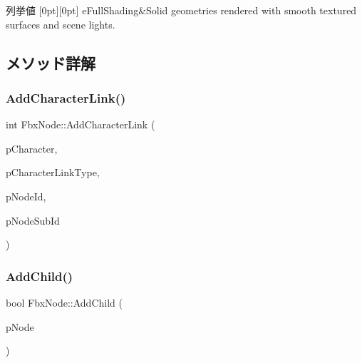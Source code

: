 \begin{DoxyEnumFields}{列挙値}
[0pt][0pt]{}\mbox{\label{class_fbx_node_ab65aa5e41d10dfb4c887667c9a56019daefdf7b2d72751923449653d4a31780b6}} 
e\+Full\+Shading&Solid geometries rendered with smooth textured surfaces and scene lights. \\
\hline

\end{DoxyEnumFields}


\subsection{メソッド詳解}
\mbox{\label{class_fbx_node_ad534d65600668327fe8abdd8f7628c1e}} 
\subsubsection{\texorpdfstring{Add\+Character\+Link()}{AddCharacterLink()}}
{\footnotesize\ttfamily int Fbx\+Node\+::\+Add\+Character\+Link (\begin{DoxyParamCaption}\item[{\hyperlink{class_fbx_character}{Fbx\+Character} $\ast$}]{p\+Character,  }\item[{int}]{p\+Character\+Link\+Type,  }\item[{int}]{p\+Node\+Id,  }\item[{int}]{p\+Node\+Sub\+Id }\end{DoxyParamCaption})}

\mbox{\label{class_fbx_node_af509126aa76e418e12af88a6d92e3475}} 
\subsubsection{\texorpdfstring{Add\+Child()}{AddChild()}}
{\footnotesize\ttfamily bool Fbx\+Node\+::\+Add\+Child (\begin{DoxyParamCaption}\item[{\hyperlink{class_fbx_node}{Fbx\+Node} $\ast$}]{p\+Node }\end{DoxyParamCaption})}

